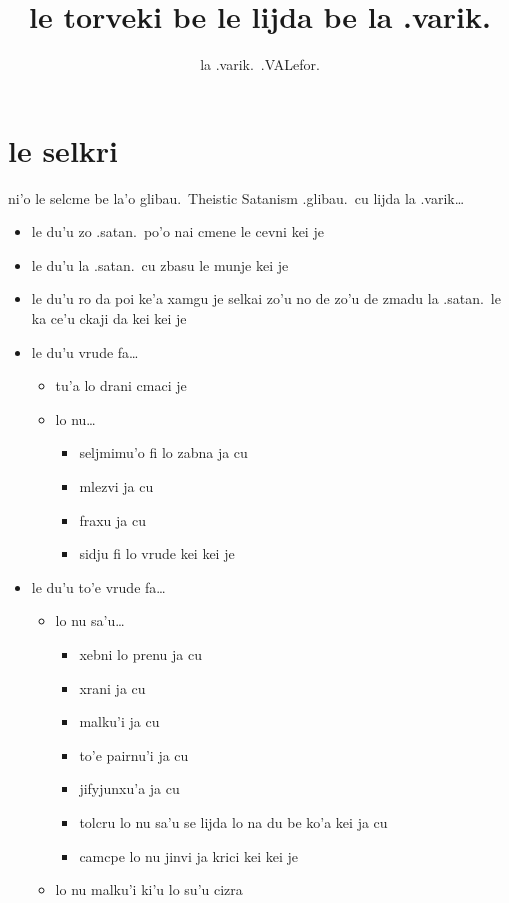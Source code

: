 \documentclass{article}
\title{le torveki be le lijda be la .varik.}
\author{la .varik.\ .VALefor.}
\begin{document}
\maketitle

\section{le selkri}

ni'o le selcme be la'o glibau.\ Theistic Satanism .glibau.\ cu lijda la .varik\ldots

\begin{itemize}
	\item le du'u zo .satan.\ po'o nai cmene le cevni kei je
	\item le du'u la .satan.\ cu zbasu le munje kei je
	\item le du'u ro da poi ke'a xamgu je selkai zo'u no de zo'u de zmadu la .satan.\ le ka ce'u ckaji da kei kei je
	\item le du'u vrude fa\ldots{}
	\begin{itemize}
		\item tu'a lo drani cmaci je
		\item lo nu\ldots{}
		\begin{itemize}
			\item seljmimu'o fi lo zabna ja cu
			\item mlezvi ja cu
			\item fraxu ja cu
			\item sidju fi lo vrude kei kei je
		\end{itemize}
	\end{itemize}
	\item le du'u to'e vrude fa\ldots{}
	\begin{itemize}
		\item lo nu sa'u\ldots{}
		\begin{itemize}
			\item xebni lo prenu ja cu
			\item xrani ja cu
			\item malku'i ja cu
			\item to'e pairnu'i ja cu
			\item jifyjunxu'a ja cu
			\item tolcru lo nu sa'u se lijda lo na du be ko'a kei ja cu
			\item camcpe lo nu jinvi ja krici kei kei je
		\end{itemize}
		\item lo nu malku'i ki'u lo su'u cizra
	\end{itemize}
\end{itemize}
\end{document}
